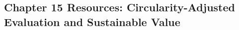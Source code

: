 \begin{refsection}
\chapter{Chapter 15 Resources: Circularity-Adjusted Evaluation and Sustainable Value}
\label{chap:comp-ch15}



\printbibliography[heading=subbibliography,title={Chapter 15 References}]
\end{refsection}
